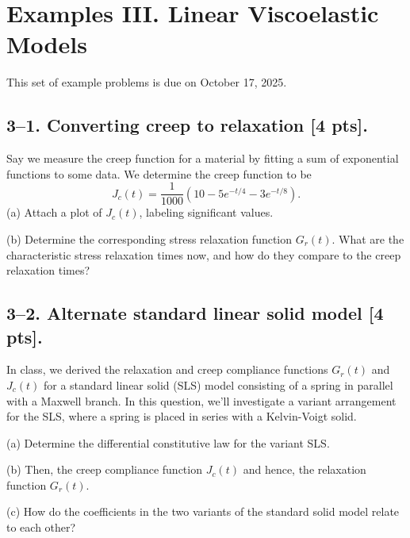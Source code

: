 \setcounter{section}{3} %


\section*{Examples III. Linear Viscoelastic Models}
\label{PS3}

This set of example problems is due on October 17, 2025. 


\medskip
\subsection*{3--1. \textbf{Converting creep to relaxation} [4 pts].} 
Say we measure the creep function for a material by fitting a sum of exponential functions to some data. 
We determine the creep function to be 
\begin{equation}
    J_c(t) = \frac{1}{1000}\left(10 - 5 e^{-t/4} - 3e^{-t/8}\right).
\end{equation}
(a) Attach a plot of $J_c(t)$, labeling significant values.

(b) Determine the corresponding stress relaxation function $G_r(t)$. What are the characteristic stress relaxation times now, and how do they compare to the creep relaxation times? 

\bigskip
\bigskip
\bigskip
\subsection*{3--2. \textbf{Alternate standard linear solid model} [4 pts].}

In class, we derived the relaxation and creep compliance functions $G_r(t)$ and $J_c(t)$ for a standard linear solid (SLS) model consisting of a spring in parallel with a Maxwell branch. 
In this question, we'll investigate a variant arrangement for the SLS, where a spring is placed in series with a Kelvin-Voigt solid. 

(a) Determine the differential constitutive law for the variant SLS. 

(b) Then, the creep compliance function $J_c(t)$ and hence, the relaxation function $G_r(t)$.

(c) How do the coefficients in the two variants of the standard solid model relate to each other?

\bigskip
\bigskip
\bigskip
